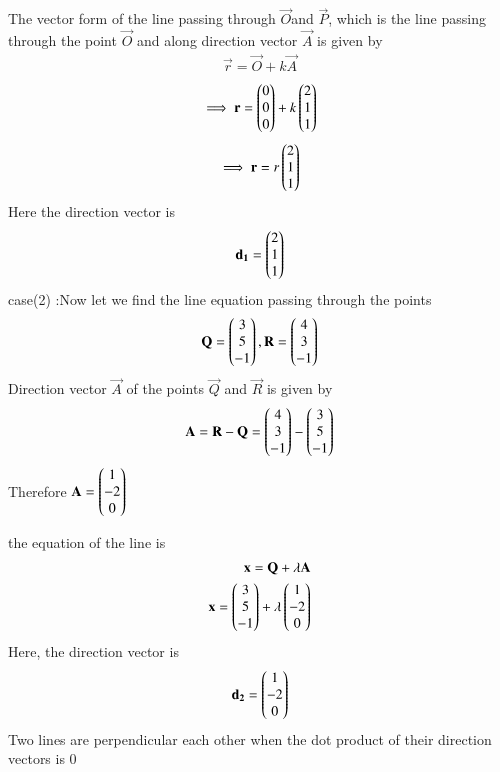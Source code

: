 \documentclass[journal,12pt,twocolumn]{IEEEtran}
\begin{document}
The vector form of the line passing through $\vec{O} $and $\vec{P}$, which is the line passing through the point $\vec{O}$ and along direction vector $\vec{A}$ is given by 
\begin{align}
\vec{r}=\vec{O}+k\vec{A}
\end{align}
\begin{align}
\implies \mathbf{r}=\begin{pmatrix}0\\0\\0\end{pmatrix}+k\begin{pmatrix}2\\1\\1\end{pmatrix}
\end{align}
\begin{align}
\implies \mathbf{r}=r\begin{pmatrix}2\\1\\1\end{pmatrix}
\end{align}
Here the direction vector is 
\begin{align}
\mathbf{d_1}=\begin{pmatrix}2\\1\\1\end{pmatrix}
\end{align}
case(2) :Now let we find the line equation passing through the points
\begin{align}
\mathbf{Q}=\begin{pmatrix}3\\5\\-1\end{pmatrix} , \mathbf{R}=\begin{pmatrix}4\\3\\-1\end{pmatrix}
\end{align}
Direction vector $\vec{A}$ of the points $\vec{Q}$ and $\vec{R}$ is given by 
\begin{align}
\mathbf{A}=\mathbf{R}-\mathbf{Q}
=\begin{pmatrix}4\\3\\-1\end{pmatrix}-\begin{pmatrix}3\\5\\-1\end{pmatrix}
\end{align}
Therefore $\mathbf{A}=\begin{pmatrix}1\\-2\\0\end{pmatrix}$

the equation of the line is 
\begin{align}
\mathbf{x}=\mathbf{Q}+\lambda\mathbf{A}
\\
\mathbf{x}=\begin{pmatrix}3\\5\\-1\end{pmatrix}+\lambda\begin{pmatrix}1\\-2\\0\end{pmatrix}
\end{align}
Here, the direction vector is 
\begin{align}
\mathbf{d_2}=\begin{pmatrix}1\\-2\\0\end{pmatrix}
\end{align}
Two lines are perpendicular each other when the dot product of their direction vectors is 0
\end{document}
